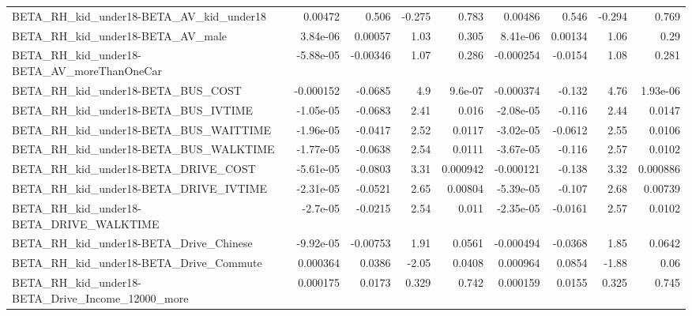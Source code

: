 \begin{tabular}{lrrrrrrrr}
BETA\_RH\_kid\_under18-BETA\_AV\_kid\_under18            &     0.00472 &        0.506 &   -0.275 &    0.783 &    0.00486 &       0.546 &       -0.294 &         0.769 \\
BETA\_RH\_kid\_under18-BETA\_AV\_male                   &    3.84e-06 &      0.00057 &     1.03 &    0.305 &   8.41e-06 &     0.00134 &         1.06 &          0.29 \\
BETA\_RH\_kid\_under18-BETA\_AV\_moreThanOneCar         &   -5.88e-05 &     -0.00346 &     1.07 &    0.286 &  -0.000254 &     -0.0154 &         1.08 &         0.281 \\
BETA\_RH\_kid\_under18-BETA\_BUS\_COST                  &   -0.000152 &      -0.0685 &      4.9 &  9.6e-07 &  -0.000374 &      -0.132 &         4.76 &      1.93e-06 \\
BETA\_RH\_kid\_under18-BETA\_BUS\_IVTIME                &   -1.05e-05 &      -0.0683 &     2.41 &    0.016 &  -2.08e-05 &      -0.116 &         2.44 &        0.0147 \\
BETA\_RH\_kid\_under18-BETA\_BUS\_WAITTIME              &   -1.96e-05 &      -0.0417 &     2.52 &   0.0117 &  -3.02e-05 &     -0.0612 &         2.55 &        0.0106 \\
BETA\_RH\_kid\_under18-BETA\_BUS\_WALKTIME              &   -1.77e-05 &      -0.0638 &     2.54 &   0.0111 &  -3.67e-05 &      -0.116 &         2.57 &        0.0102 \\
BETA\_RH\_kid\_under18-BETA\_DRIVE\_COST                &   -5.61e-05 &      -0.0803 &     3.31 & 0.000942 &  -0.000121 &      -0.138 &         3.32 &      0.000886 \\
BETA\_RH\_kid\_under18-BETA\_DRIVE\_IVTIME              &   -2.31e-05 &      -0.0521 &     2.65 &  0.00804 &  -5.39e-05 &      -0.107 &         2.68 &       0.00739 \\
BETA\_RH\_kid\_under18-BETA\_DRIVE\_WALKTIME            &    -2.7e-05 &      -0.0215 &     2.54 &    0.011 &  -2.35e-05 &     -0.0161 &         2.57 &        0.0102 \\
BETA\_RH\_kid\_under18-BETA\_Drive\_Chinese             &   -9.92e-05 &     -0.00753 &     1.91 &   0.0561 &  -0.000494 &     -0.0368 &         1.85 &        0.0642 \\
BETA\_RH\_kid\_under18-BETA\_Drive\_Commute             &    0.000364 &       0.0386 &    -2.05 &   0.0408 &   0.000964 &      0.0854 &        -1.88 &          0.06 \\
BETA\_RH\_kid\_under18-BETA\_Drive\_Income\_12000\_more   &    0.000175 &       0.0173 &    0.329 &    0.742 &   0.000159 &      0.0155 &        0.325 &         0.745 \\

\end{tabular}
